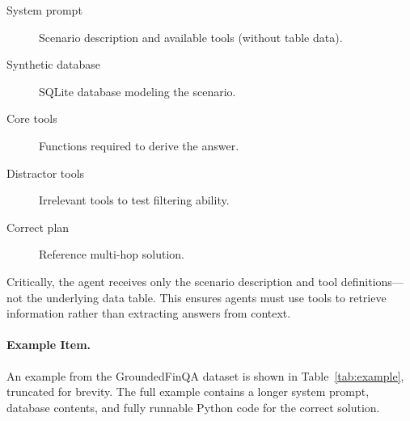 \documentclass[11pt]{article}
\newcommand{\groundedfinqa}{GroundedFinQA\xspace}
\begin{document}
\begin{description}
    \item[System prompt] Scenario description and available tools (without table data).
    \item[Synthetic database] SQLite \citep{sqlite} database modeling the scenario.
    \item[Core tools] Functions required to derive the answer.
    \item[Distractor tools] Irrelevant tools to test filtering ability.
    \item[Correct plan] Reference multi-hop solution.
\end{description}

Critically, the agent receives only the scenario description and tool definitions---not the underlying data table. This ensures agents must use tools to retrieve information rather than extracting answers from context.

\paragraph{Example Item.}
An example from the \groundedfinqa dataset is shown in Table~\ref{tab:example}, truncated for brevity. The full example contains a longer system prompt, database contents, and fully runnable Python code for the correct solution.
\end{document}
